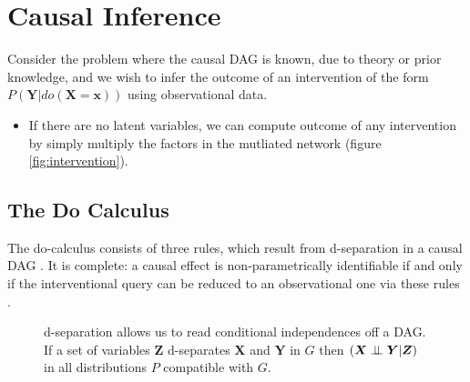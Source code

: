 \documentclass[20pt]{extreport}
\begin{document}
\section*{Causal Inference}

Consider the problem where the causal DAG is known, due to theory or prior knowledge, and we wish to infer the outcome of an intervention of the form $P(\boldsymbol{Y}|do(\boldsymbol{X}=\boldsymbol{x}))$ using observational data.

\begin{itemize}
\item If there are no latent variables, we can compute outcome of any intervention by simply multiply the factors in the mutliated network (figure \ref{fig:intervention}).
\end{itemize}



\subsection*{The Do Calculus}

The do-calculus consists of three rules, which result from d-separation in a causal DAG \cite{Pearl2000}. It is complete: a causal effect is non-parametrically identifiable if and only if the interventional query can be reduced to an observational one via these rules \cite{Shpitser2008}. 

\begin{figure}
\caption{d-separation allows us to read conditional independences off a DAG. If a set of variables $\boldsymbol{Z}$ d-separates $\boldsymbol{X}$ and $\boldsymbol{Y}$ in $G$ then ${(\boldsymbol{X} \perp\!\!\!\perp \boldsymbol{Y}|\boldsymbol{Z})}$ in all distributions $P$ compatible with $G$. }
\label{fig:dsep}
\centering
{}
\end{figure}
\end{document}
